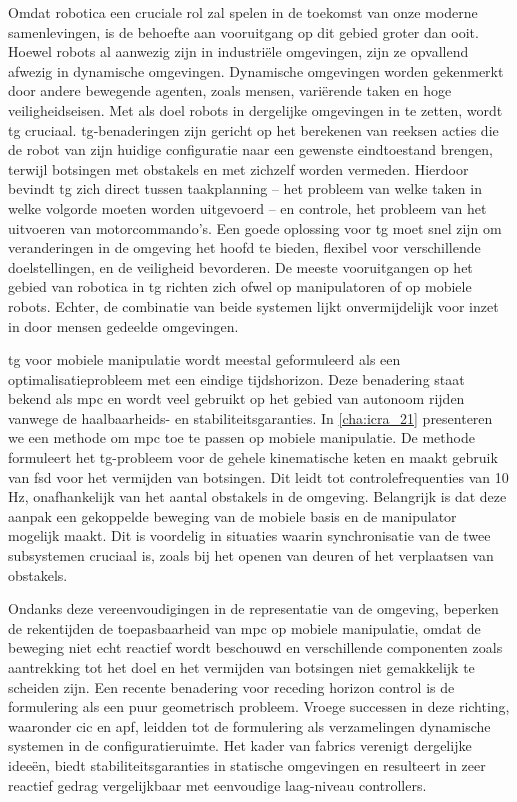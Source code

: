 \acresetall
Omdat robotica een cruciale rol zal spelen in de toekomst van onze moderne
samenlevingen, is de behoefte aan vooruitgang op dit gebied groter dan ooit.
Hoewel robots al aanwezig zijn in industriële omgevingen, zijn ze opvallend
afwezig in dynamische omgevingen. Dynamische omgevingen worden gekenmerkt door
andere bewegende agenten, zoals mensen, variërende taken en hoge
veiligheidseisen. Met als doel robots in dergelijke omgevingen in te zetten,
wordt \ac{tg} cruciaal. \Ac{tg}-benaderingen zijn gericht op het berekenen van
reeksen acties die de robot van zijn huidige configuratie naar een
gewenste eindtoestand brengen, terwijl botsingen met obstakels en met zichzelf
worden vermeden. Hierdoor bevindt \ac{tg} zich direct tussen taakplanning – het
probleem van welke taken in welke volgorde moeten worden uitgevoerd – en
controle, het probleem van het uitvoeren van motorcommando's. Een goede
oplossing voor \ac{tg} moet snel zijn om veranderingen in de omgeving het hoofd
te bieden, flexibel voor verschillende doelstellingen, en de veiligheid
bevorderen. De meeste vooruitgangen op het gebied van robotica in \ac{tg}
richten zich ofwel op manipulatoren of op mobiele robots. Echter, de combinatie
van beide systemen lijkt onvermijdelijk voor inzet in door mensen gedeelde
omgevingen.

\Ac{tg} voor mobiele manipulatie wordt meestal geformuleerd als een
optimalisatieprobleem met een eindige tijdshorizon. Deze benadering staat bekend
als \ac{mpc} en wordt veel gebruikt op het gebied van autonoom rijden vanwege de
haalbaarheids- en stabiliteitsgaranties. In \cref{cha:icra_21} presenteren we
een methode om \ac{mpc} toe te passen op mobiele manipulatie. De methode
formuleert het \ac{tg}-probleem voor de gehele kinematische keten en maakt
gebruik van \ac{fsd} voor het vermijden van botsingen. Dit leidt tot
controlefrequenties van 10 Hz, onafhankelijk van het aantal obstakels in de
omgeving. Belangrijk is dat deze aanpak een gekoppelde beweging van de mobiele
basis en de manipulator mogelijk maakt. Dit is voordelig in situaties waarin
synchronisatie van de twee subsystemen cruciaal is, zoals bij het openen van
deuren of het verplaatsen van obstakels.

Ondanks deze vereenvoudigingen in de representatie van de omgeving, beperken de
rekentijden de toepasbaarheid van \ac{mpc} op mobiele manipulatie, omdat de
beweging niet echt reactief wordt beschouwd en verschillende componenten zoals
aantrekking tot het doel en het vermijden van botsingen
niet gemakkelijk te scheiden zijn. Een
recente benadering voor receding horizon control is de formulering als een
puur geometrisch probleem. Vroege successen in deze richting, waaronder \ac{cic}
en \ac{apf}, leidden tot de formulering als verzamelingen dynamische systemen
in de configuratieruimte. Het kader van \ac{fabrics}
verenigt dergelijke ideeën, biedt stabiliteitsgaranties in statische omgevingen
en resulteert in zeer reactief gedrag vergelijkbaar met eenvoudige laag-niveau
controllers.


